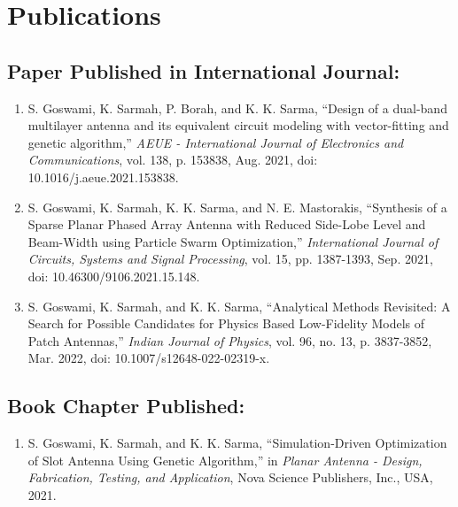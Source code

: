 \chapter*{Publications}
\section*{Paper Published in International Journal:}
\begin{enumerate}
\item S. Goswami, K. Sarmah, P. Borah, and K. K. Sarma, ``Design of a dual-band multilayer antenna and its equivalent circuit modeling with vector-fitting and genetic algorithm,'' \emph{AEUE - International Journal of Electronics and Communications}, vol. 138, p. 153838, Aug. 2021, doi: 10.1016/j.aeue.2021.153838.
\item S. Goswami, K. Sarmah, K. K. Sarma, and N. E. Mastorakis, ``Synthesis of a Sparse Planar Phased Array Antenna with Reduced Side-Lobe Level and Beam-Width using Particle Swarm Optimization,'' \emph{International Journal of Circuits, Systems and Signal Processing}, vol. 15, pp. 1387-1393, Sep. 2021, doi: 10.46300/9106.2021.15.148.
\item S. Goswami, K. Sarmah, and K. K. Sarma, ``Analytical Methods Revisited: A Search for Possible Candidates for Physics Based Low-Fidelity Models of Patch Antennas,'' \emph{Indian Journal of Physics}, vol. 96, no. 13, p. 3837-3852, Mar. 2022, doi: 10.1007/s12648-022-02319-x.
\end{enumerate}

\section*{Book Chapter Published:}
\begin{enumerate}
\item S. Goswami, K. Sarmah, and K. K. Sarma, ``Simulation-Driven Optimization of Slot Antenna Using Genetic Algorithm,'' in \emph{Planar Antenna - Design, Fabrication, Testing, and Application}, Nova Science Publishers, Inc., USA, 2021.
\end{enumerate}

